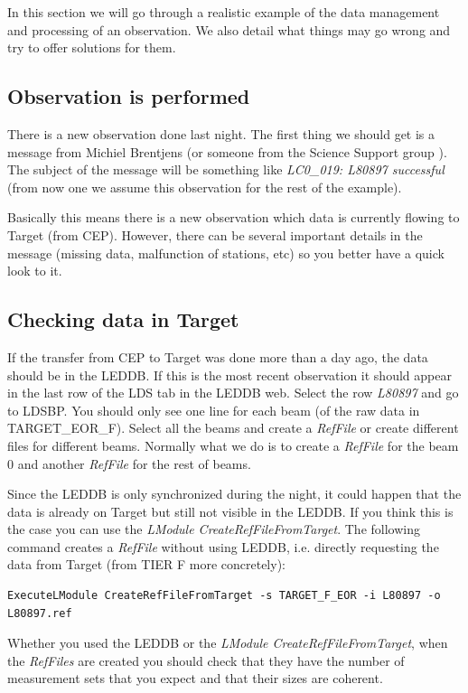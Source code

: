 \documentclass[a4paper,11pt]{article}
\begin{document}
In this section we will go through a realistic example of the data management and processing of an observation. We also detail what things may go wrong and try to offer solutions for them.

\subsection{Observation is performed}

There is a new observation done last night. The first thing we should get is a message from Michiel Brentjens (or someone from the Science Support group ). The subject of the message will be something like \textit{LC0\_019: L80897 successful} (from now one we assume this observation for the rest of the example).

Basically this means there is a new observation which data is currently flowing to Target (from CEP). However, there can be several important details in the message (missing data, malfunction of stations, etc) so you better have a quick look to it.

\subsection{Checking data in Target}

If the transfer from CEP to Target was done more than a day ago, the data should be in the LEDDB. If this is the most recent observation it should appear in the last row of the LDS tab in the LEDDB web. Select the row \textit{L80897} and go to LDSBP. You should only see one line for each beam (of the raw data in TARGET\_EOR\_F). Select all the beams and create a \textit{RefFile} or create different files for different beams. Normally what we do is to create a \textit{RefFile} for the beam 0 and another \textit{RefFile} for the rest of beams.

Since the LEDDB is only synchronized during the night, it could happen that the data is already on Target but still not visible in the LEDDB. If you think this is the case you can use the \textit{LModule CreateRefFileFromTarget}. 
The following command creates a \textit{RefFile} without using LEDDB, i.e. directly requesting the data from Target (from TIER F more concretely):

\begin{verbatim}
ExecuteLModule CreateRefFileFromTarget -s TARGET_F_EOR -i L80897 -o L80897.ref
\end{verbatim}

Whether you used the LEDDB or the \textit{LModule CreateRefFileFromTarget}, when the \textit{RefFiles} are created you should check that they have the number of measurement sets that you expect and that their sizes are coherent.
\end{document}
